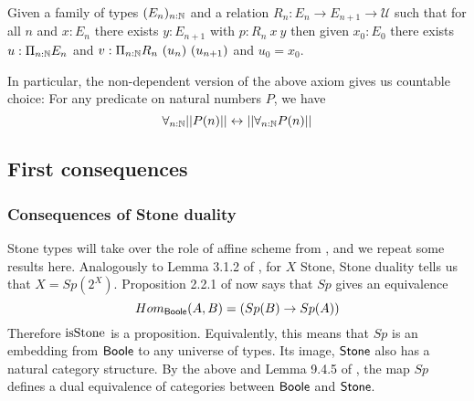 \begin{axiomNum}\label{axDependentChoice}
  Given a family of types $(E_n)_{n:\mathbb{N}}$ and 
  a relation 
  $R_n:E_n\rightarrow E_{n+1}\rightarrow {\mathcal U}$ such that
  for all $n$ and $x:E_n$ there exists $y:E_{n+1}$ with $p:R_n~x~y$ 
  then given $x_0:E_0$ there exists
  $u:\Pi_{n:\mathbb{N}}E_n$ and $v:\Pi_{n:\mathbb{N}}R_n~(u_n)~(u_{n+1})$ and $u_0 = x_0$.
\end{axiomNum}

\begin{corollary}
  In particular, the non-dependent version of the above axiom gives 
  us countable choice:
  For any predicate on natural numbers $P$, we have 
  \begin{equation}
    \forall_{n:\mathbb{N}} ||P(n) ||
    \leftrightarrow 
    || \forall_{n:\mathbb{N}} P(n) ||
  \end{equation}
\end{corollary}

\subsection{First consequences}
\subsubsection{Consequences of Stone duality}
\begin{remark}\label{SpIsAntiEquivalence}
Stone types will take over the role of affine scheme from \cite{draft}, 
and we repeat some results here. 
Analogously to Lemma 3.1.2 of \cite{draft}, 
for $X$ Stone, Stone duality tells us that $X = Sp(2^X)$. 
%
Proposition 2.2.1 of \cite{draft} now says that 
$Sp$ gives an equivalence 
\begin{equation}
   Hom_{\mathsf{Boole}} (A, B) = (Sp(B) \to Sp(A))
\end{equation}
Therefore $\mathrm{isStone}$ is a proposition.
Equivalently, 
this means that 
$Sp$ is an embedding from $\mathsf{Boole}$ to any universe of types.
Its image, $\mathsf{Stone}$ also has a natural category structure.
By the above and Lemma 9.4.5 of \cite{hott}, 
the map $Sp$ defines a dual equivalence of categories between $\mathsf{Boole}$ and $\mathsf{Stone}$.
\end{remark}


